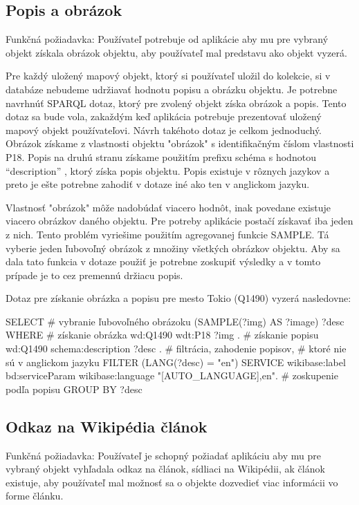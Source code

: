 \subsection{Popis a obrázok}
Funkčná požiadavka: Používateľ potrebuje od aplikácie aby mu pre vybraný objekt získala obrázok objektu,
aby používateľ mal predstavu ako objekt vyzerá.

Pre každý uložený mapový objekt, ktorý si používateľ uložil do kolekcie, si v databáze nebudeme udržiavať hodnotu popisu a obrázku objektu.
Je potrebne navrhnúť SPARQL dotaz, ktorý pre zvolený objekt získa obrázok a popis. Tento dotaz sa bude vola, zakaždým keď aplikácia potrebuje prezentovať uložený mapový objekt používateľovi.
Návrh takéhoto dotaz je celkom jednoduchý. Obrázok získame z vlastnosti objektu "obrázok" s identifikačným číslom vlastnosti P18.
Popis na druhú stranu získame použitím prefixu schéma s hodnotou “description” , ktorý získa popis objektu. Popis existuje v rôznych jazykov a preto je ešte potrebne zahodiť v dotaze iné ako ten v anglickom jazyku.

Vlastnosť "obrázok" môže nadobúdať viacero hodnôt, inak povedane existuje viacero obrázkov daného objektu. Pre potreby aplikácie postačí získavať iba jeden z nich.
Tento problém vyriešime použitím agregovanej funkcie SAMPLE. Tá vyberie jeden ľubovoľný obrázok z množiny všetkých obrázkov objektu.
Aby sa dala tato funkcia v dotaze použiť je potrebne zoskupiť výsledky a v tomto prípade je to cez premennú držiacu popis.

Dotaz pre získanie obrázka a popisu pre mesto Tokio (Q1490) vyzerá nasledovne:
\begin{code}
      SELECT
      # vybranie ľubovoľného obrázoku
      (SAMPLE(?img) AS ?image)
      ?desc
      WHERE {
      # získanie obrázka
      wd:Q1490 wdt:P18 ?img .
      # získanie popisu
      wd:Q1490 schema:description ?desc .
      # filtrácia, zahodenie popisov,
      # ktoré nie sú v anglickom jazyku
      FILTER (LANG(?desc) = "en")
      SERVICE wikibase:label {
      bd:serviceParam wikibase:language "[AUTO_LANGUAGE],en".
      }
      # zoskupenie podľa popisu
      } GROUP BY ?desc
\end{code}

\subsection{Odkaz na Wikipédia článok}
Funkčná požiadavka: Používateľ je schopný požiadať aplikáciu aby mu pre vybraný objekt vyhľadala odkaz na článok, sídliaci na Wikipédii, ak článok existuje, aby používateľ mal možnosť
sa o objekte dozvedieť viac informácii vo forme článku.

